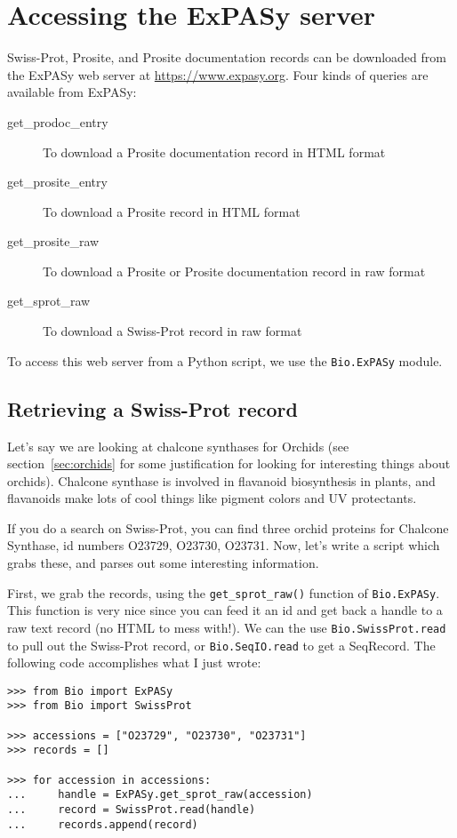 \section{Accessing the ExPASy server}

Swiss-Prot, Prosite, and Prosite documentation records can be downloaded from the ExPASy web server at \url{https://www.expasy.org}. Four kinds of queries are available from ExPASy:
\begin{description}
\item[get\_prodoc\_entry]To download a Prosite documentation record in HTML format
\item[get\_prosite\_entry]To download a Prosite record in HTML format
\item[get\_prosite\_raw]To download a Prosite or Prosite documentation record in raw format
\item[get\_sprot\_raw]To download a Swiss-Prot record in raw format
\end{description}
To access this web server from a Python script, we use the \verb|Bio.ExPASy| module.

\subsection{Retrieving a Swiss-Prot record}
\label{sec:expasy_swissprot}

Let's say we are looking at chalcone synthases for Orchids (see section~\ref{sec:orchids} for some justification for looking for interesting things about orchids). Chalcone synthase is involved in flavanoid biosynthesis in plants, and flavanoids make lots of cool things like pigment colors and UV protectants.

If you do a search on Swiss-Prot, you can find three orchid proteins for Chalcone Synthase, id numbers O23729, O23730, O23731. Now, let's write a script which grabs these, and parses out some interesting information.

First, we grab the records, using the \verb|get_sprot_raw()| function of \verb|Bio.ExPASy|. This function is very nice since you can feed it an id and get back a handle to a raw text record (no HTML to mess with!). We can the use \verb|Bio.SwissProt.read| to pull out the Swiss-Prot record, or \verb|Bio.SeqIO.read| to get a SeqRecord. The following code accomplishes what I just wrote:

\begin{verbatim}
>>> from Bio import ExPASy
>>> from Bio import SwissProt

>>> accessions = ["O23729", "O23730", "O23731"]
>>> records = []

>>> for accession in accessions:
...     handle = ExPASy.get_sprot_raw(accession)
...     record = SwissProt.read(handle)
...     records.append(record)
\end{verbatim}

